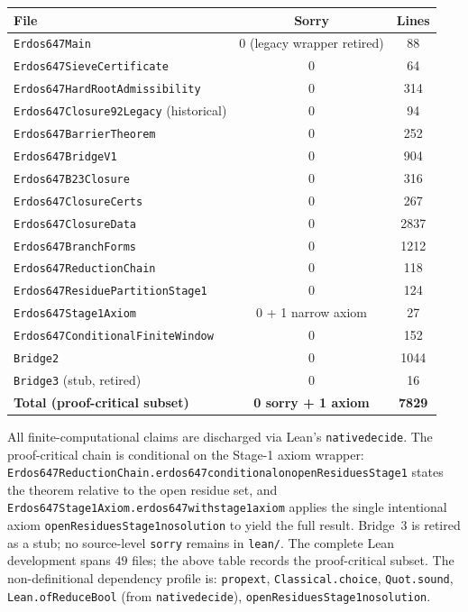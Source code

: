 \documentclass[11pt]{article}
\renewcommand{\_}{\origunderscore\allowbreak}
\theoremstyle{definition}
\theoremstyle{remark}
\begin{document}
\begin{center}
\begin{tabular}{lcc}
\hline
\textbf{File} & \textbf{Sorry} & \textbf{Lines} \\
\hline
\texttt{Erdos647Main} & 0 (legacy wrapper retired) & 88 \\
\texttt{Erdos647SieveCertificate} & 0 & 64 \\
\texttt{Erdos647HardRootAdmissibility} & 0 & 314 \\
\texttt{Erdos647Closure92\_Legacy} (historical) & 0 & 94 \\
\texttt{Erdos647BarrierTheorem} & 0 & 252 \\
\texttt{Erdos647BridgeV1} & 0 & 904 \\
\texttt{Erdos647B23Closure} & 0 & 316 \\
\texttt{Erdos647ClosureCerts} & 0 & 267 \\
\texttt{Erdos647ClosureData} & 0 & 2837 \\
\texttt{Erdos647BranchForms} & 0 & 1212 \\
\texttt{Erdos647ReductionChain} & 0 & 118 \\
\texttt{Erdos647ResiduePartitionStage1} & 0 & 124 \\
\texttt{Erdos647Stage1Axiom} & 0 + 1 narrow axiom & 27 \\
\texttt{Erdos647ConditionalFiniteWindow} & 0 & 152 \\
\texttt{Bridge2} & 0 & 1044 \\
\texttt{Bridge3} (stub, retired) & 0 & 16 \\
\hline
\textbf{Total (proof-critical subset)} & \textbf{0 sorry + 1 axiom} & \textbf{7829} \\
\hline
\end{tabular}
\end{center}

All finite-computational claims are discharged via Lean's
\texttt{native\_decide}. The proof-critical chain is conditional on the
Stage-1 axiom wrapper:
\texttt{Erdos647ReductionChain.erdos647\_conditional\_on\_openResiduesStage1}
states the theorem relative to the open residue set, and
\texttt{Erdos647Stage1Axiom.erdos647\_with\_stage1\_axiom} applies the
single intentional axiom
\texttt{openResiduesStage1\_no\_solution} to yield the full result.
Bridge~3 is retired as a stub; no source-level \texttt{sorry} remains
in \texttt{lean/}. The complete Lean development spans $49$ files; the
above table records the proof-critical subset. The non-definitional
dependency profile is:
\texttt{propext}, \texttt{Classical.choice}, \texttt{Quot.sound},
\texttt{Lean.ofReduceBool} (from \texttt{native\_decide}),
\texttt{openResiduesStage1\_no\_solution}.
\end{document}
